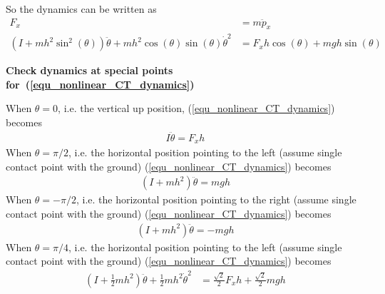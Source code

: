 \documentclass[12pt]{article}
\begin{document}
So the dynamics can be written as 
\begin{align}
F_x &= m\ddot{p}_x \\
(I+mh^2\sin^2(\theta))\ddot{\theta}+mh^2\cos(\theta)\sin(\theta)\dot{\theta}^2
&= F_xh\cos(\theta) + mgh\sin(\theta)
\label{equ_nonlinear_CT_dynamics}
\end{align}

\textbf{Check dynamics at special points 
for~(\ref{equ_nonlinear_CT_dynamics})}

When $\theta=0$, i.e. the vertical up position,
(\ref{equ_nonlinear_CT_dynamics}) becomes
\begin{align}
I\ddot{\theta} = F_xh
\end{align}
When $\theta=\pi/2$, i.e. the horizontal position pointing to the left
(assume single contact point with the ground)
(\ref{equ_nonlinear_CT_dynamics}) becomes
\begin{align}
(I+mh^2)\ddot{\theta} = mgh
\end{align}
When $\theta=-\pi/2$, i.e. the horizontal position pointing to the right
(assume single contact point with the ground)
(\ref{equ_nonlinear_CT_dynamics}) becomes
\begin{align}
(I+mh^2)\ddot{\theta} = -mgh
\end{align}
When $\theta=\pi/4$, i.e. the horizontal position pointing to the left
(assume single contact point with the ground)
(\ref{equ_nonlinear_CT_dynamics}) becomes
\begin{align}
(I+\frac{1}{2}mh^2)\ddot{\theta}+\frac{1}{2}mh^2\dot{\theta}^2
&= \frac{\sqrt{2}}{2}F_xh + \frac{\sqrt{2}}{2}mgh
\end{align}
\end{document}
